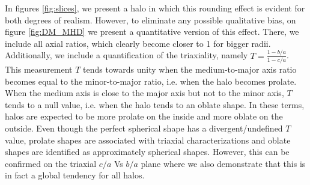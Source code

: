 In figures \ref{fig:slices}, we present a halo in which this rounding effect is evident for both degrees of realism. However, to eliminate any possible qualitative bias, on figure \ref{fig:DM_MHD} we present a quantitative version of this effect. There, we include all axial ratios, which clearly become closer to 1 for bigger radii. Additionally, we include a quantification of the triaxiality, namely $T=\frac{1-b/a}{1-c/a}$.\\

 This measurement $T$ tends towards unity when the medium-to-major axis ratio becomes equal to the minor-to-major ratio, i.e. when the halo becomes prolate. When the medium axis is close to the major axis but not to the minor axis, $T$ tends to a null value, i.e. when the halo tends to an oblate shape. In these terms, halos are expected to be more prolate on the inside and more oblate on the outside. Even though the perfect spherical shape has a divergent/undefined $T$ value, prolate shapes are associated with triaxial characterizations and oblate shapes are identified as approximately spherical shapes. However, this can be confirmed on the triaxial $c/a$ Vs $b/a$ plane where we also demonstrate that this is in fact a global tendency for all halos.\\


